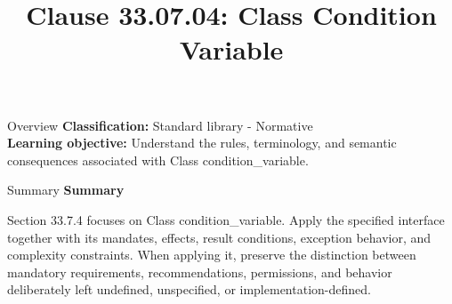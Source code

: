 \documentclass[10pt,letterpaper]{article}
\title{Clause 33.07.04: Class Condition Variable}
\author{}
\date{}
\begin{document}
\maketitle
\begin{CornellOverviewBox}{Overview}
\textbf{Classification:} Standard library - Normative\\[2pt]
\textbf{Learning objective:} Understand the rules, terminology, and semantic consequences associated with Class condition\_variable.
\end{CornellOverviewBox}\begin{CornellSummaryBox}{Summary}
{\sffamily\bfseries\color{Accent} Summary}\par\vspace{3pt}Section 33.7.4 focuses on Class condition\_variable. Apply the specified interface together with its mandates, effects, result conditions, exception behavior, and complexity constraints. When applying it, preserve the distinction between mandatory requirements, recommendations, permissions, and behavior deliberately left undefined, unspecified, or implementation-defined.
\end{CornellSummaryBox}
\end{document}
